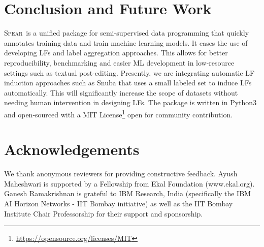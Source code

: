 \documentclass[11pt]{article}
\newcommand{\spear}{\mbox{\textsc{Spear}}}
\begin{document}
\section{Conclusion and Future Work}
\spear\ is a unified package for semi-supervised data programming that  quickly annotates training data and train machine learning models. 
It eases the use of developing LFs and label aggregation approaches. This allows for better reproducibility, benchmarking and easier ML development in low-resource settings such as textual post-editing. %
Presently, we are integrating automatic LF induction approaches such as Snuba \cite{varma2018snuba} that uses a small labeled set to induce LFs automatically. This will significantly increase the scope of datasets without needing human intervention in designing LFs. The package is written in Python3 and open-sourced with a MIT License\footnote{\url{https://opensource.org/licenses/MIT}} open for community contribution.


\section{Acknowledgements}
We thank anonymous reviewers for providing constructive feedback. Ayush Maheshwari is supported by a Fellowship from Ekal Foundation (www.ekal.org). Ganesh Ramakrishnan is grateful to IBM Research, India (specifically the IBM AI Horizon Networks - IIT Bombay initiative) as well
as the IIT Bombay Institute Chair Professorship for
their support and sponsorship.







\end{document}
